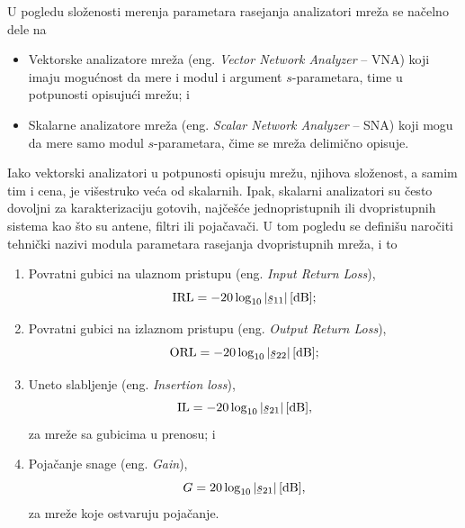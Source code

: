 \documentclass[a4paper, 12pt, diplomski]{etf}
\renewcommand{\unit}[1]{\,{\rm #1}}   %
\newcommand{\faz}[1]{\underaccent{\bar}{#1}}
\begin{document}
U pogledu složenosti merenja parametara rasejanja 
analizatori mreža se načelno dele na 
\begin{itemize}
    \item Vektorske analizatore mreža 
    (eng. \textit{Vector Network Analyzer} -- VNA) koji
    imaju mogućnost 
    da mere i modul i argument $s$-parametara,
    time u potpunosti opisujući mrežu; i
    \item Skalarne analizatore mreža
    (eng. \textit{Scalar Network Analyzer} --
    SNA) koji mogu da mere samo 
    modul $s$-parametara, čime se mreža 
    delimično opisuje.
\end{itemize}
Iako vektorski analizatori u potpunosti
opisuju mrežu, njihova složenost, a samim tim i cena, je višestruko
veća od skalarnih. Ipak, skalarni 
analizatori su često dovoljni za karakterizaciju
gotovih, najčešće jednopristupnih ili dvopristupnih sistema
kao što su antene, filtri ili pojačavači. U tom pogledu se
definišu naročiti tehnički nazivi modula parametara 
rasejanja dvopristupnih mreža, i to
\begin{enumerate}
    \item Povratni gubici na ulaznom 
    pristupu (eng. \textit{Input Return Loss}), 
    $${\rm IRL} = - 20 \log_{10}|\faz s_{11}|\unit{[dB]};$$ 
    \item Povratni gubici na izlaznom 
    pristupu (eng. \textit{Output Return Loss}), 
    $${\rm ORL} = - 20 \log_{10}|\faz s_{22}|\unit{[dB]};$$
    \item Uneto slabljenje (eng. \textit{Insertion loss}), 
    $${\rm IL} = - 20 \log_{10}|\faz s_{21}|\unit{[dB]},$$ za mreže sa gubicima u 
    prenosu; i
    \item Pojačanje snage (eng. \textit{Gain}), 
    $$G = 20 \log_{10}|\faz s_{21}|\unit{[dB]},$$ za mreže koje ostvaruju pojačanje.
\end{enumerate}
\end{document}
